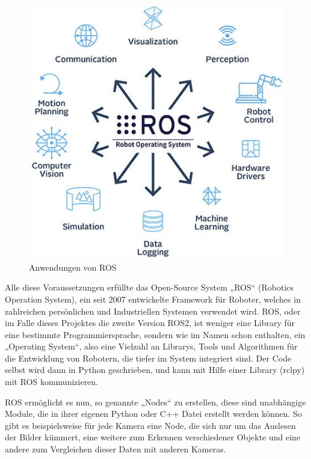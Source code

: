 \documentclass[12pt]{article}
\begin{document}
\begin{figure}
\centering
  \includegraphics[angle=0,width=\linewidth]{ROS_diagram.jpg}
  \caption{Anwendungen von ROS}
\end{figure}
Alle diese Voraussetzungen erfüllte das Open-Source System „ROS“ (Robotics Operation System), ein seit 2007 entwickelte Framework für Roboter, welches in zahlreichen persönlichen und Industriellen Systemen verwendet wird. ROS, oder im Falle dieses Projektes die zweite Version ROS2, ist weniger eine Library für eine bestimmte Programmiersprache, sondern wie im Namen schon enthalten, ein „Operating System“, also eine Vielzahl an Librarys, Tools und Algorithmen für die Entwicklung von Robotern, die tiefer im System integriert sind. Der Code selbst wird dann in Python geschrieben, und kann mit Hilfe einer Library (rclpy) mit ROS kommunizieren. 

ROS ermöglicht es nun, so genannte „Nodes“ zu erstellen, diese sind unabhängige Module, die in ihrer eigenen Python oder C++ Datei erstellt werden können. So gibt es beispielsweise für jede Kamera eine Node, die sich nur um das Auslesen der Bilder kümmert, eine weitere zum Erkennen verschiedener Objekte und eine andere zum Vergleichen dieser Daten mit anderen Kameras.  

\newpage
\end{document}
